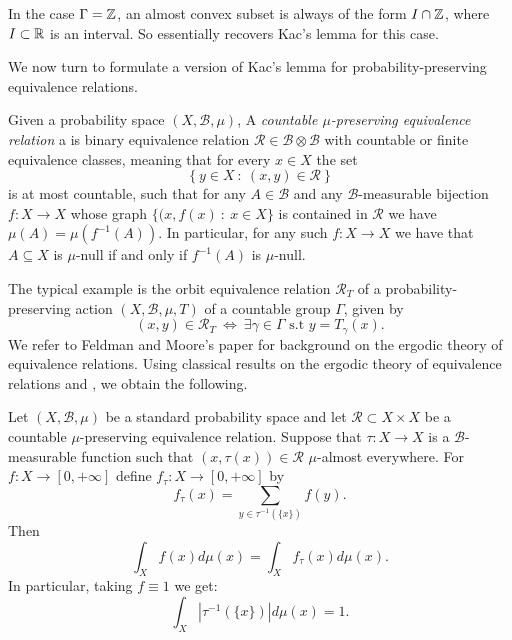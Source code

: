 \documentclass[12pt,reqno]{amsart}
\begin{document}
In the case $\Gamma= \mathbb{Z}$, an almost convex subset is  always of the form $I \cap \mathbb{Z}$, where $I \subset \mathbb{R}$ is an interval.
So  essentially recovers Kac's lemma for this case.

We now turn to formulate a version of Kac's lemma for probability-preserving equivalence relations.

Given a  probability space  $(X,\mathcal{B},\mu)$,
A \emph{countable $\mu$-preserving equivalence relation} a is  binary  equivalence relation $\mathcal{R} \in \mathcal{B} \otimes \mathcal{B}$ with countable or finite equivalence classes, meaning that
for every $x \in X$ the set
\[
\left\{ y \in X~:~  (x,y) \in \mathcal{R}\right\}
\]
is at most countable, such that for any $A \in \mathcal{B}$ and any $\mathcal{B}$-measurable bijection $f:X \to X$ whose graph $\{(x,f(x)~:~ x \in X\}$ is contained in $\mathcal{R}$ we have $\mu(A)=\mu(f^{-1}(A))$. In particular, for any  such $f:X\to X$ we have that $A \subseteq X$ is $\mu$-null if and only if $f^{-1}(A)$ is $\mu$-null.

The typical example is the orbit equivalence relation $\mathcal{R}_T$ of a probability-preserving action $(X,\mathcal{B},\mu,T)$ of a countable group $\Gamma$, given by
\[ (x,y)\in \mathcal{R}_T ~\Leftrightarrow ~ \exists \gamma \in \Gamma \mbox{ s.t } y= T_\gamma(x).\]
We refer to Feldman and Moore's paper \cite{MR578656} for background on the ergodic theory of equivalence relations.
Using classical results on the ergodic theory of equivalence relations and , we obtain the following.

\begin{thm}\label{thm:Kac_orbit_relation}
    Let $(X,\mathcal{B},\mu)$ be a standard probability space and let $\mathcal{R} \subset X \times X$ be a countable $\mu$-preserving equivalence relation.
    Suppose that $\tau:X \to X$ is a $\mathcal{B}$-measurable function such that $(x,\tau(x)) \in \mathcal{R}$ $\mu$-almost everywhere.
    For $f:X \to [0,+\infty]$ define 
    $f_\tau:X \to [0,+\infty]$ by
    \begin{equation}\label{eq:f_tau_def}
    f_\tau(x) = \sum_{y \in \tau^{-1}(\{x\})}f(y).
    \end{equation}
    Then
    \begin{equation}\label{eq:f_tau_Kac}
    \int_X f(x) d\mu(x)= \int_X f_\tau(x) d\mu(x).    
    \end{equation}
    In particular, taking $f \equiv 1$ we get:
    \begin{equation}\label{eq:preimages_exp}
        \int_X \left| \tau^{-1}( \{x\}) \right| d\mu(x)=1.
    \end{equation}
\end{thm}
\end{document}
